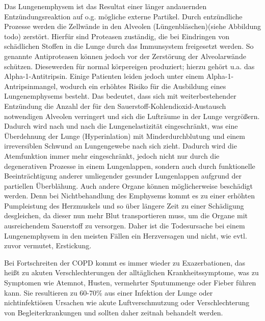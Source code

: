 Das Lungenemphysem ist das Resultat einer länger andauernden Entzündungsreaktion auf o.g. mögliche externe Partikel. Durch entzündliche Prozesse  werden die Zellwände in den Alveolen  (Lüngenbläschen)(siehe Abbildung todo) zerstört. Hierfür sind Proteasen zuständig, die bei Eindringen von schädlichen Stoffen in die Lunge durch das Immunsystem freigesetzt werden. So genannte Antiproteasen können jedoch vor der Zerstörung der Alveolarwände schützen. Diesewerden für normal körpereigen produziert; hierzu gehört u.a. das Alpha-1-Antitripsin. Einige Patienten leiden jedoch unter einem Alpha-1-Antripsinmangel, wodurch ein erhöhtes Risiko für die Ausbildung eines Lungenemphysems besteht.
Das bedeutet, dass sich mit weiterbestehender Entzündung die Anzahl der für den Sauerstoff-Kohlendioxid-Austausch notwendigen Alveolen verringert und sich die Lufträume in der Lunge vergrößern. Dadurch wird nach und nach die Lungenelastizität eingeschränkt, was eine Überdehnung der Lunge (Hyperinlation) mit Minderdurchblutung und einem irreversiblen Schwund an Lungengewebe nach sich zieht. Dadurch wird die Atemfunktion immer mehr eingeschränkt, jedoch nicht nur durch die degenerativen Prozesse in einem Lungenlappen, sondern auch durch funktionelle Beeinträchtigung anderer umliegender gesunder Lungenlappen aufgrund der partiellen Überblähung. Auch andere Organe können möglicherweise beschädigt werden. Denn bei Nichtbehandlung des Emphysems kommt es zu einer erhöhten Pumpleistung des Herzmuskels und so über längere Zeit zu einer Schädigung desgleichen, da dieser nun mehr Blut transportieren muss, um die Organe mit ausreichendem Sauerstoff zu versorgen. Daher ist die Todesursache bei einem Lungenemphysem in den meisten Fällen ein Herzversagen und nicht, wie evtl. zuvor vermutet, Erstickung.

Bei Fortschreiten der COPD kommt es immer wieder zu Exazerbationen, das heißt zu akuten Verschlechterungen der alltäglichen Krankheitssymptome, was zu Symptomen wie Atemnot, Husten, vermehrter Sputummenge oder Fieber führen kann. Sie resultieren zu 60-70\% aus einer Infektion der Lunge oder nichtinfektiösen Ursachen wie akute Luftverschmutzung oder Verschlechterung von Begleiterkrankungen und sollten daher zeitnah behandelt werden.


